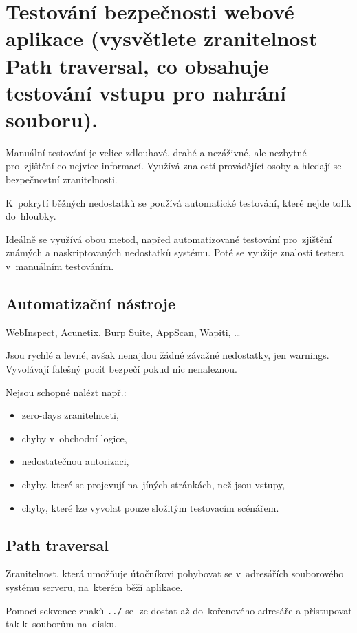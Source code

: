 \clearpage
\section{Testování bezpečnosti webové aplikace (vysvětlete zranitelnost Path traversal, co obsahuje testování vstupu pro nahrání souboru).}

Manuální testování je velice zdlouhavé, drahé a nezáživné, ale nezbytné pro~zjištění co nejvíce informací. Využívá znalostí provádějící osoby a hledají se bezpečnostní zranitelnosti.

K~pokrytí běžných nedostatků se používá automatické testování, které nejde tolik do~hloubky.

Ideálně se využívá obou metod, napřed automatizované testování pro~zjištění známých a naskriptovaných nedostatků systému. Poté se využije znalosti testera v~manuálním testováním.

\subsection{Automatizační nástroje}

WebInspect, Acunetix, Burp Suite, AppScan, Wapiti, \dots

Jsou rychlé a levné, avšak nenajdou žádné závažné nedostatky, jen warnings. Vyvolávají falešný pocit bezpečí pokud nic nenaleznou.

Nejsou schopné nalézt např.:

\begin{itemize}
    \item zero-days zranitelnosti,
    \item chyby v~obchodní logice,
    \item nedostatečnou autorizaci,
    \item chyby, které se projevují na~jíných stránkách, než jsou vstupy,
    \item chyby, které lze vyvolat pouze složitým testovacím scénářem.
\end{itemize}


\subsection{Path traversal}

Zranitelnost, která umožňuje útočníkovi pohybovat se v~adresářích souborového systému serveru, na~kterém běží aplikace.

Pomocí sekvence znaků \texttt{../} se lze dostat až do~kořenového adresáře a přistupovat tak k~souborům na~disku.

